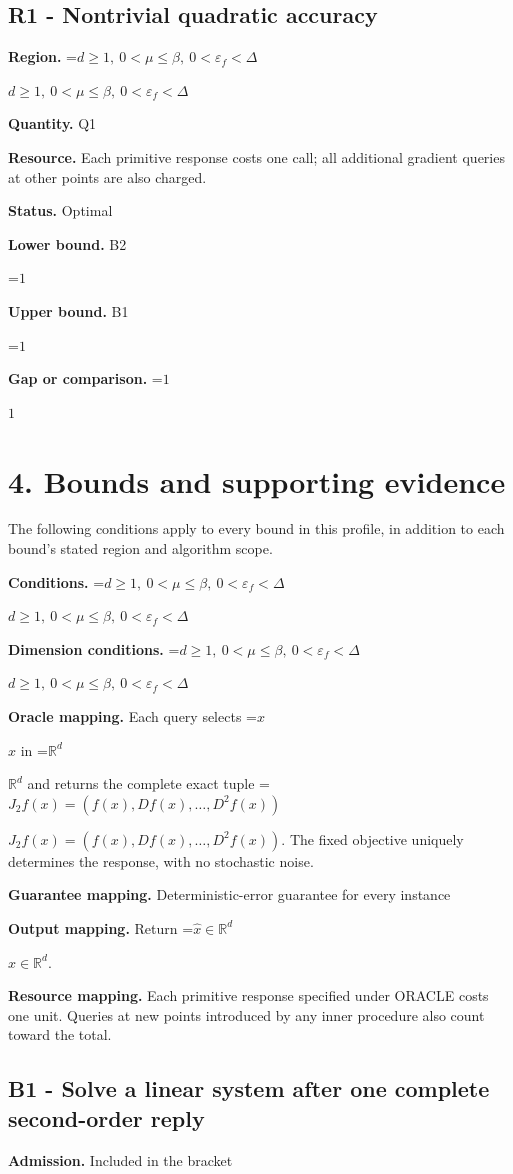 \documentclass[10pt,a4paper]{article}
\newcommand{\AtlasMath}[1]{\par\begingroup\centering\setbox0=\hbox{$\displaystyle #1$}\ifdim\wd0>1.4\linewidth\typeout{ATLAS WIDE FORMULA: \the\wd0}\fi\ifdim\wd0>\linewidth\resizebox{\linewidth}{!}{\box0}\else\box0\fi\par\endgroup}
\newcommand{\AtlasInlineMath}[1]{\begingroup\setbox0=\hbox{$#1$}\ifdim\wd0>.4\linewidth\endgroup\AtlasMath{#1}\else\endgroup$#1$\fi}
\begin{document}
\subsection{R1 - Nontrivial quadratic accuracy}
\textbf{Region.} \AtlasInlineMath{d\ge1,\ 0<\mu\le\beta,\ 0<\varepsilon_f<\Delta}

\textbf{Quantity.} Q1

\textbf{Resource.} Each primitive response costs one call; all additional gradient queries at other points are also charged.

\textbf{Status.} Optimal

\textbf{Lower bound.} B2

\AtlasMath{1}
\textbf{Upper bound.} B1

\AtlasMath{1}
\textbf{Gap or comparison.} \AtlasInlineMath{1}

\section{4. Bounds and supporting evidence}
The following conditions apply to every bound in this profile, in addition to each bound's stated region and algorithm scope.

\textbf{Conditions.} \AtlasInlineMath{d\ge1,\ 0<\mu\le\beta,\ 0<\varepsilon_f<\Delta}

\textbf{Dimension conditions.} \AtlasInlineMath{d\ge1,\ 0<\mu\le\beta,\ 0<\varepsilon_f<\Delta}

\textbf{Oracle mapping.} Each query selects \AtlasInlineMath{x} in \AtlasInlineMath{\mathbb{R}^d} and returns the complete exact tuple \AtlasInlineMath{J_{2}f(x)=(f(x),Df(x),\ldots,D^{2}f(x))}. The fixed objective uniquely determines the response, with no stochastic noise.

\textbf{Guarantee mapping.} Deterministic-error guarantee for every instance

\textbf{Output mapping.} Return \AtlasInlineMath{\widehat{x}\in \mathbb{R}^d}.

\textbf{Resource mapping.} Each primitive response specified under ORACLE costs one unit. Queries at new points introduced by any inner procedure also count toward the total.

\subsection{B1 - Solve a linear system after one complete second-order reply}
\textbf{Admission.} Included in the bracket
\end{document}
